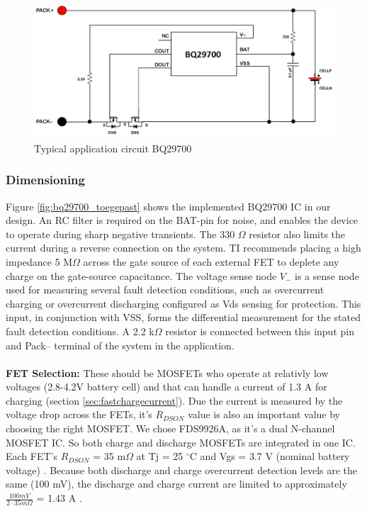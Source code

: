 \documentclass[11pt,a4paper]{article}
\begin{document}
\begin{figure}[H]
	\centering
	\includegraphics[width=0.9\linewidth]{bq29700_principeschema.png}
	\caption{Typical application circuit BQ29700 \cite{bib:BQ29700}}
	\label{fig:bq29700_principeschema}
\end{figure}

\subsubsection{Dimensioning}
Figure \ref{fig:bq29700_toegepast} shows the implemented BQ29700 IC in our design. An RC filter is required on the BAT-pin for noise, and enables the device to operate during sharp negative transients. The 330 $\Omega$ resistor also limits the current during a reverse connection on the system. TI recommends placing a high impedance 5 M$\Omega$ across the gate source of each external FET to deplete any charge on the gate-source capacitance. The voltage sense node $V_-$ is a sense node used for measuring several fault detection conditions, such as overcurrent charging or
overcurrent discharging configured as Vds sensing for protection. This input, in conjunction with VSS, forms the differential measurement for the stated fault detection conditions. A 2.2 k$\Omega$ resistor is connected between this input pin and Pack– terminal of the system in the application.
\\ \\
\textbf{FET Selection:} These should be MOSFETs who operate at relativly low voltages (2.8-4.2V battery cell) and that can handle a current of 1.3 A for charging (section \ref{sec:fastchargecurrent}). Due the current is measured by the voltage drop across the FETs, it's $R_{DSON}$ value is also an important value by choosing the right MOSFET. We chose FDS9926A, as it's a dual N-channel MOSFET IC. So both charge and discharge MOSFETs are integrated in one IC. Each FET's $R_{DSON}$ = 35 m$\Omega$ at Tj = 25 $^\circ$C and Vgs = 3.7 V (nominal battery voltage) \cite{bib:FDS9926A}. Because both discharge and charge overcurrent detection levels are the same (100 mV), the discharge and charge current are limited to approximately $\frac{100 mV}{2 \cdot 35m\Omega}$ = 1.43 A \cite{bib:BQ29700, bib:FDS9926A}.
\end{document}
